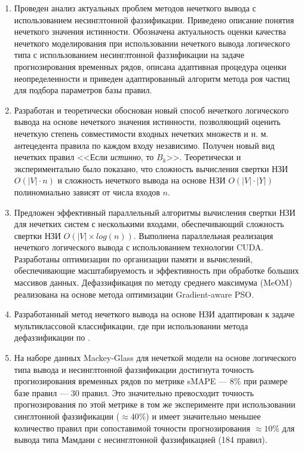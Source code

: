 \begin{enumerate}
  \item Проведен анализ актуальных проблем методов нечеткого вывода с использованием несинглтонной фаззификации. Приведено описание понятия нечеткого значения истинности. Обозначена актуальность оценки качества нечеткого моделирования при использовании нечеткого вывода логического типа с использованием несинглтонной фаззификации на задаче прогнозирования временных рядов, описана адаптивная процедура оценки неопределенности и приведен адаптированный алгоритм метода роя частиц для подбора параметров базы правил.
  \item Разработан и теоретически обоснован новый способ нечеткого логического вывода на основе нечеткого значения истинности, позволяющий оценить нечеткую степень совместимости входных нечетких множеств и н. м. антецедента правила по каждом входу независимо. Получен новый вид нечетких правил <<Если \textit{истинно}, то $B_k$>>. Теоретически и экспериментально было показано, что сложность вычисления свертки НЗИ $O(|V|\cdot n)$ и сложность нечеткого вывода на основе НЗИ  $O(|V|\cdot |Y|)$ полиномиально зависят от числа входов $n$.
  \item Предложен эффективный параллельный алгоритмы вычисления свертки НЗИ для нечетких систем с несколькими входами, обеспечивающий сложность свертки НЗИ $O(|V|\times log(n))$. Выполнена параллельная реализация нечеткого логического вывода с использованием технологии CUDA. Разработаны оптимизации по организации памяти и вычислений, обеспечивающие масштабируемость и эффективность при обработке больших массивов данных. 
  Дефаззификация по методу среднего максимума (MeOM) реализована на основе метода оптимизации Gradient-aware PSO.
  \item Разработанный метод нечеткого вывода на основе НЗИ адаптирован к задаче мультиклассовой классификации, где при использовании метода дефаззификации по .
  \item На наборе данных Mackey-Glass для нечеткой модели на основе логического типа вывода и несинглтонной фаззификации достигнута точность прогнозирования временных рядов по метрике sMAPE --- $8\%$ при размере базе правил --- 30 правил. Это значительно превосходит точность прогнозирования по этой метрике в том же эксперименте при использовании синглтонной фаззификации ($\approx 40\%$) и имеет значительно меньшее количество правил при сопоставимой точности прогнозирования $\approx 10\%$ для вывода типа Мамдани с несинглтонной фаззификацией (184 правил).

\end{enumerate}
